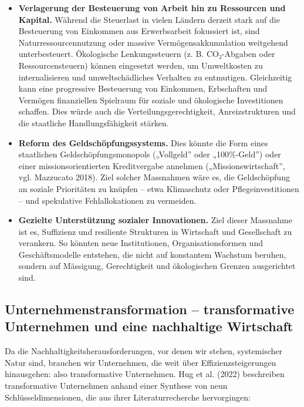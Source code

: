 \documentclass[
  nswissgerman,
  a4paper,
  openany]{book}
\begin{document}
\begin{itemize}
\item
  \textbf{Verlagerung der Besteuerung von Arbeit hin zu Ressourcen und
  Kapital.} Während die Steuerlast in vielen Ländern derzeit stark auf
  die Besteuerung von Einkommen aus Erwerbsarbeit fokussiert ist, sind
  Naturressourcennutzung oder massive Vermögensakkumulation weitgehend
  unterbesteuert. Ökologische Lenkungssteuern (z. B. CO₂-Abgaben oder
  Ressourcensteuern) können eingesetzt werden, um Umweltkosten zu
  internalisieren und umweltschädliches Verhalten zu entmutigen.
  Gleichzeitig kann eine progressive Besteuerung von Einkommen,
  Erbschaften und Vermögen finanziellen Spielraum für soziale und
  ökologische Investitionen schaffen. Dies würde auch die
  Verteilungsgerechtigkeit, Anreizstrukturen und die staatliche
  Handlungsfähigkeit stärken.
\item
  \textbf{Reform des Geldschöpfungssystems.} Dies könnte die Form eines
  staatlichen Geldschöpfungsmonopols („Vollgeld'' oder „100\%-Geld'')
  oder einer missionsorientierten Kreditvergabe annehmen
  („Missionswirtschaft'', vgl. Mazzucato 2018). Ziel solcher Massnahmen
  wäre es, die Geldschöpfung an soziale Prioritäten zu knüpfen -- etwa
  Klimaschutz oder Pflegeinvestitionen -- und spekulative
  Fehlallokationen zu vermeiden.
\item
  \textbf{Gezielte Unterstützung sozialer Innovationen.} Ziel dieser
  Massnahme ist es, Suffizienz und resiliente Strukturen in Wirtschaft
  und Gesellschaft zu verankern. So könnten neue Institutionen,
  Organisationsformen und Geschäftsmodelle entstehen, die nicht auf
  konstantem Wachstum beruhen, sondern auf Mässigung, Gerechtigkeit und
  ökologischen Grenzen ausgerichtet sind.
\end{itemize}

\subsection{Unternehmenstransformation -- transformative Unternehmen und
eine nachhaltige
Wirtschaft}\label{unternehmenstransformation-transformative-unternehmen-und-eine-nachhaltige-wirtschaft}

Da die Nachhaltigkeitsherausforderungen, vor denen wir stehen,
systemischer Natur sind, brauchen wir Unternehmen, die weit über
Effizienzsteigerungen hinausgehen: also transformative Unternehmen. Hug
et al. (2022) beschreiben transformative Unternehmen anhand einer
Synthese von neun Schlüsseldimensionen, die aus ihrer Literaturrecherche
hervorgingen:
\end{document}
